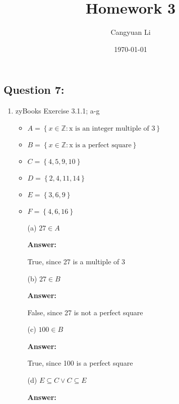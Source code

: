 \documentclass[14pt]{extreport}
\title{Homework 3}
\author{Cangyuan Li}
\date{\today}
\newcommand{\answer}[0]{\medskip \textbf{Answer:} \medskip}
\begin{document}
\maketitle

\subsection*{Question 7:}

\begin{enumerate}
    
    \item zyBooks Exercise 3.1.1; a-g
    
    \begin{itemize}
        \item \( A = \left\{ x \in \mathbb{Z}: \text{x is an integer multiple of 3} \right\} \)
        \item \( B = \left\{ x \in \mathbb{Z}: \text{x is a perfect square} \right\} \)
        \item \( C = \left\{ 4, 5, 9, 10 \right\} \)
        \item \( D = \left\{ 2, 4, 11, 14 \right\} \)
        \item \( E = \left\{ 3, 6, 9 \right\} \)
        \item \( F = \left\{ 4, 6, 16 \right\} \)
    \end{itemize}
    
        \begin{enumerate}
            \item[(a)] \( 27 \in A \)
            
                \answer

                True, since 27 is a multiple of 3

            \item[(b)] \( 27 \in B \)
            
                \answer

                False, since 27 is not a perfect square
            
            \item[(c)] \( 100 \in B \)
            
                \answer

                True, since 100 is a perfect square

            \item[(d)] \( E \subseteq C \lor C \subseteq E \)
            
                \answer


\end{enumerate}
\end{enumerate}
\end{document}
